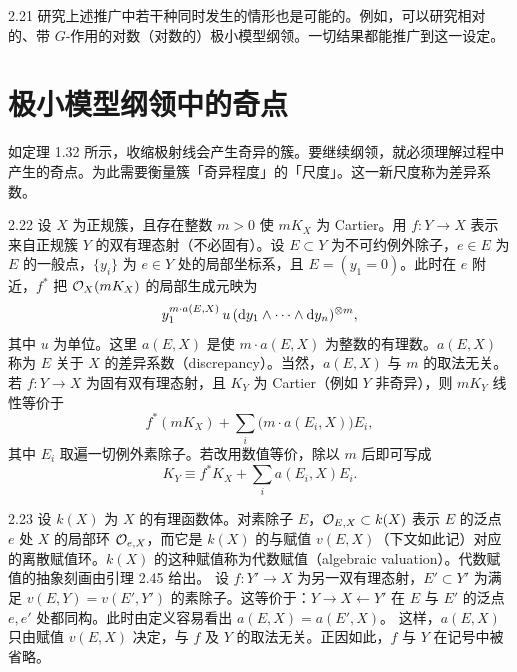 
\begin{example}{2.21}
研究上述推广中若干种同时发生的情形也是可能的。例如，可以研究相对的、带 $G$-作用的对数（对数的）极小模型纲领。一切结果都能推广到这一设定。
\end{example}

\section{极小模型纲领中的奇点}

如定理 1.32 所示，收缩极射线会产生奇异的簇。要继续纲领，就必须理解过程中产生的奇点。为此需要衡量簇「奇异程度」的「尺度」。这一新尺度称为差异系数。

\begin{definition}{2.22}
设 $X$ 为正规簇，且存在整数 $m>0$ 使 $mK_X$ 为 Cartier。用 $f\colon Y\to X$ 表示来自正规簇 $Y$ 的双有理态射（不必固有）。设 $E\subset Y$ 为不可约例外除子，$e\in E$ 为 $E$ 的一般点，$\{y_i\}$ 为 $e\in Y$ 处的局部坐标系，且 $E=(y_1=0)$。此时在 $e$ 附近，$f^*$ 把 $\mathcal{O}_X(mK_X)$ 的局部生成元映为
\[
y_1^{m\cdot a(E,X)}\,u\,(\mathrm{d} y_1\wedge\cdots\wedge \mathrm{d} y_n)^{\otimes m},
\]
其中 $u$ 为单位。这里 $a(E,X)$ 是使 $m\cdot a(E,X)$ 为整数的有理数。$a(E,X)$ 称为 $E$ 关于 $X$ 的差异系数（discrepancy）。当然，$a(E,X)$ 与 $m$ 的取法无关。
若 $f\colon Y\to X$ 为固有双有理态射，且 $K_Y$ 为 Cartier（例如 $Y$ 非奇异），则 $mK_Y$ 线性等价于
\[
f^*(mK_X)+\sum_i\bigl(m\cdot a(E_i,X)\bigr)E_i,
\]
其中 $E_i$ 取遍一切例外素除子。若改用数值等价，除以 $m$ 后即可写成
\[
K_Y\equiv f^*K_X+\sum_i a(E_i,X)E_i.
\]
\noindent
\end{definition}


\begin{remark}{2.23}
设 $k(X)$ 为 $X$ 的有理函数体。对素除子 $E$，$\mathcal{O}_{E,X}\subset k(X)$
表示 $E$ 的泛点 $e$ 处 $X$ 的局部环 $\mathcal{O}_{e,X}$，而它是 $k(X)$ 的与赋值 $v(E,X)$（下文如此记）对应的离散赋值环。$k(X)$ 的这种赋值称为代数赋值（algebraic valuation）。代数赋值的抽象刻画由引理 2.45 给出。
设 $f\colon Y'\to X$ 为另一双有理态射，$E'\subset Y'$ 为满足 $v(E,Y)=v(E',Y')$ 的素除子。这等价于：$Y\to X\leftarrow Y'$ 在 $E$ 与 $E'$ 的泛点 $e,e'$ 处都同构。此时由定义容易看出 $a(E,X)=a(E',X)$。
这样，$a(E,X)$ 只由赋值 $v(E,X)$ 决定，与 $f$ 及 $Y$ 的取法无关。正因如此，$f$ 与 $Y$ 在记号中被省略。
\end{remark}

